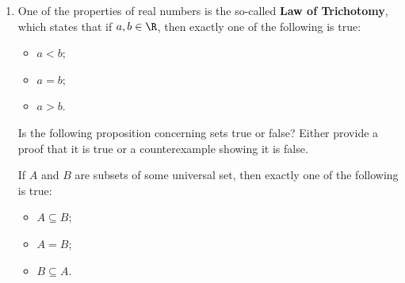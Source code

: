 \begin{enumerate}
\begin{enumerate}
\end{enumerate}




\item One of the properties of real numbers is the so-called \textbf{Law of Trichotomy}, 
%
which states that if $a, b \in \R$, then exactly one of the following is true:  

\begin{multicols}{3}
\begin{itemize}
\item $a < b$;
\item $a = b$;
\item $a > b$.
\end{itemize}
\end{multicols}

\noindent
Is the following proposition concerning sets true or false?  Either provide a proof that it is true or a counterexample showing it is false.

\noindent
If $A$ and $B$ are subsets of some universal set, then exactly one of the following is true: 

\begin{multicols}{3}
\begin{itemize}
\item $A \subseteq B$;
\item $A = B$;
\item $B \subseteq A$.
\end{itemize}
\end{multicols}

\end{enumerate}

